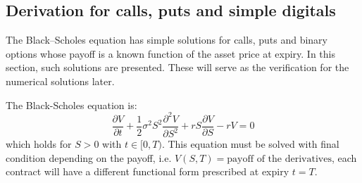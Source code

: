\subsection{Derivation for calls, puts and simple digitals}
The Black–Scholes equation has simple solutions for calls, puts and binary options whose payoff is a known function of the asset price at expiry. In this section, such solutions are presented. These will serve as the verification for the numerical solutions later. 

The Black-Scholes equation is:
\begin{equation}
    \frac{\partial V}{\partial t} + \frac{1}{2} \sigma^2 S^2 \frac{\partial^2 V}{\partial S^2} + r S \frac{\partial V}{\partial S} - r V = 0
    \label{equ:black-scholes-sol}
\end{equation}
which holds for $S > 0$ with $t \in [0, T)$. This equation must be solved with final condition depending on the payoff, i.e. $V(S,T) = \text{payoff of the derivatives}$, each contract will have a different functional form prescribed at expiry $t = T$.

